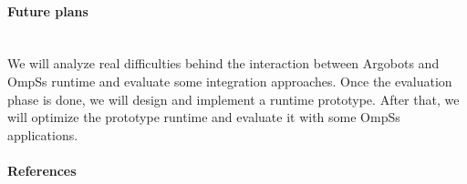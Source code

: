 \begin{refsection}
\paragraph{Future plans}~\\

We will analyze real difficulties behind the interaction between Argobots and
OmpSs runtime and evaluate some integration approaches. Once the evaluation
phase is done, we will design and implement a runtime prototype. After that, we
will optimize the prototype runtime and evaluate it with some OmpSs
applications.


\paragraph{References}~\\

\printbibliography[heading=none,notkeyword=own]
\end{refsection}